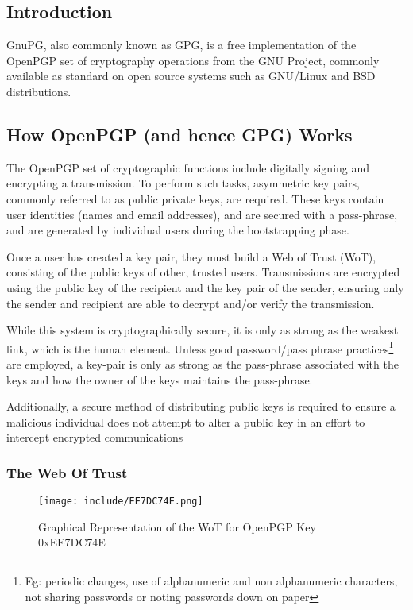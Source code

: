 
\subsection{Introduction}

GnuPG, also commonly known as GPG, is a free implementation of the
OpenPGP set of cryptography operations from the GNU Project, commonly
available as standard on open source systems such as GNU/Linux and BSD 
distributions.

\subsection{How OpenPGP (and hence GPG) Works}

The OpenPGP set of cryptographic functions include digitally signing and
encrypting a transmission. To perform such tasks, asymmetric key pairs,
commonly referred to as public private keys, are required. These keys
contain user identities (names and email addresses), and are secured 
with a pass-phrase, and are generated by individual users during the 
bootstrapping phase.


Once a user has created a key pair, they must build a Web of Trust 
(WoT), consisting of the public keys of other, trusted users.
Transmissions are encrypted using the public key of the recipient and
the key pair of the sender, ensuring only the sender and recipient are
able to decrypt and/or verify the transmission.


While this system is cryptographically secure, it is only as strong as
the weakest link, which is the human element. Unless 
good password/pass phrase practices\footnote{Eg: periodic changes, use 
of alphanumeric and non alphanumeric characters, not sharing passwords 
or noting passwords down on paper} are employed, a key-pair is only as 
strong as the pass-phrase associated with the keys and how the owner of 
the keys maintains the pass-phrase.


Additionally, a secure method of distributing public keys is required to
ensure a malicious individual does not attempt to alter a public key in
an effort to intercept encrypted communications

\subsubsection{The Web Of Trust}

\begin{figure}[p]

\label{fig:wot}

\begin{center}

\texttt{[image: include/EE7DC74E.png]}

\end{center}

\caption{Graphical Representation of the WoT for OpenPGP Key 0xEE7DC74E}

\end{figure}

